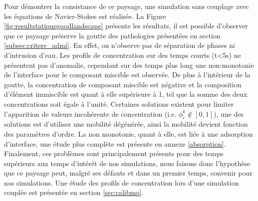 Pour démontrer la consistance de ce paysage, une simulation sans couplage avec les équations de Navier-Stokes est réalisée. La Figure \ref{fig:resultstatiquegoodlandscape} présente les résultats, il est possible d'observer que ce paysage préserve la goutte des pathologies présentées en section \ref{subsec:critere_admi}. En effet, on n'observe pas de séparation de phases ni d'intrusion d'eau. Les profils de concentration sur des temps courts (t<5s) ne présentent pas d'anomalie, cependant sur des temps plus long une non-monotonie de l'interface pour le composant miscible est observée. De plus à l'intérieur de la goutte, la concentration de composant miscible est négative et la composition d'élément immiscible est quant à elle supérieure à 1, tel que la somme des deux concentrations soit égale à l'unité. Certaines solutions existent pour limiter l'apparition de valeurs incohérente de concentration (i.e. $\phi_{i}^k \notin [0,1]$), une des solutions est d'utiliser une mobilité dégénérée, ainsi la mobilité devient fonction des paramètres d'ordre. La non monotonie, quant à elle, est liée à une adsorption d'interface, une étude plus complète est présente en annexe \ref{absorption}. Finalement, ces problèmes sont principalement présents pour des temps supérieurs aux temps d'intérêt de nos simulations, nous faisons donc l'hypothèse que ce paysage peut, malgré ses défauts et dans un premier temps, convenir pour nos simulations. Une étude des profils de concentration lors d'une simulation couplée est présentée en section \ref{sec:calibmo}.
